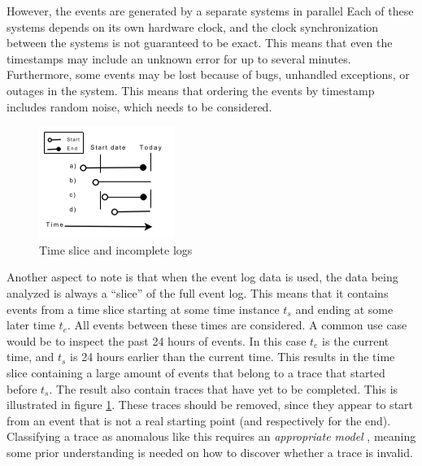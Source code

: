 However, the events are generated by a separate systems in parallel
Each of these systems depends on its own hardware clock, and the clock synchronization between the systems is not guaranteed to be exact. 
This means that even the timestamps may include an unknown error for up to several minutes.
Furthermore, some events may be lost because of bugs, unhandled exceptions, or outages in the system.
This means that ordering the events by timestamp includes random noise, which needs to be considered.

\begin{figure}[htb]
\centering \includegraphics[width=0.5\linewidth]{gfx/figures/slice.png}
\caption{Time slice and incomplete logs }
\label{fig:timeslice}
\end{figure}

Another aspect to note is that when the event log data is used, the data being analyzed is always a ``slice'' of the full event log.
This means that it contains events from a time slice starting at some time instance $t_s$ and ending at some later time $t_e$. 
All events between these times are considered. 
A common use case would be to inspect the past 24 hours of events. 
In this case $t_e$ is the current time, and $t_s$ is 24 hours earlier than the current time. 
This results in the time slice containing a large amount of events that belong to a trace that started before $t_s$.
The result also contain traces that have yet to be completed. 
This is illustrated in figure \ref{fig:timeslice}. 
These traces should be removed, since they appear to start from an event that is not a real starting point (and respectively for the end). 
Classifying a trace as anomalous like this requires an \emph{appropriate model} \cite{bezerra2009anomaly},
meaning some prior understanding is needed on how to discover whether a trace is invalid.

